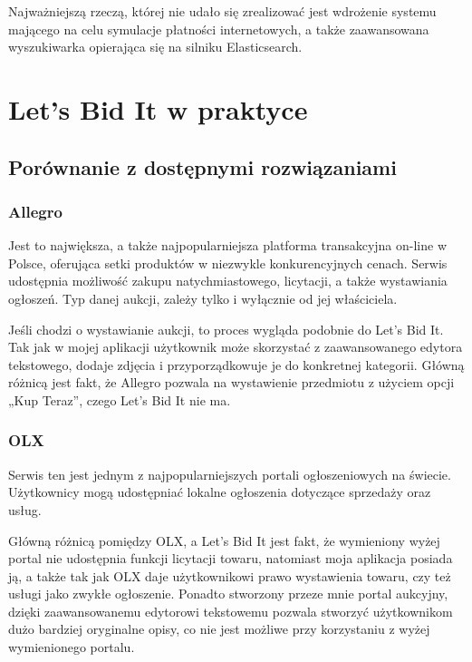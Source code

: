 \documentclass[brudnopis]{xmgr}
\begin{document}
Najważniejszą rzeczą, której nie udało się zrealizować jest wdrożenie systemu mającego na celu symulacje płatności internetowych, a także zaawansowana wyszukiwarka opierająca się na silniku Elasticsearch.


\chapter{Let's Bid It w praktyce}

\section{Porównanie z dostępnymi rozwiązaniami}

\subsection{Allegro}

Jest to największa, a także najpopularniejsza platforma transakcyjna on-line w Polsce, oferująca setki produktów w niezwykle konkurencyjnych cenach. Serwis udostępnia możliwość zakupu natychmiastowego, licytacji, a także wystawiania ogłoszeń. Typ danej aukcji, zależy tylko i wyłącznie od jej właściciela.

Jeśli chodzi o wystawianie aukcji, to proces wygląda podobnie do Let's Bid It. Tak jak w mojej aplikacji użytkownik może skorzystać z zaawansowanego edytora tekstowego, dodaje zdjęcia i przyporządkowuje je do konkretnej kategorii. Główną różnicą jest fakt, że Allegro pozwala na wystawienie przedmiotu z użyciem opcji „Kup Teraz”, czego Let's Bid It nie ma.

\subsection{OLX}

Serwis ten jest jednym z najpopularniejszych portali ogłoszeniowych na świecie. Użytkownicy
mogą udostępniać lokalne ogłoszenia dotyczące sprzedaży oraz usług.

Główną różnicą pomiędzy OLX, a Let's Bid It jest fakt,
że wymieniony wyżej portal nie udostępnia funkcji licytacji towaru, natomiast moja aplikacja posiada ją, a także tak jak OLX daje użytkownikowi prawo wystawienia towaru, czy też usługi jako zwykłe ogłoszenie. Ponadto stworzony przeze mnie portal aukcyjny, dzięki zaawansowanemu edytorowi tekstowemu pozwala stworzyć użytkownikom dużo bardziej oryginalne opisy, co nie jest możliwe przy korzystaniu z wyżej wymienionego portalu.
\end{document}
